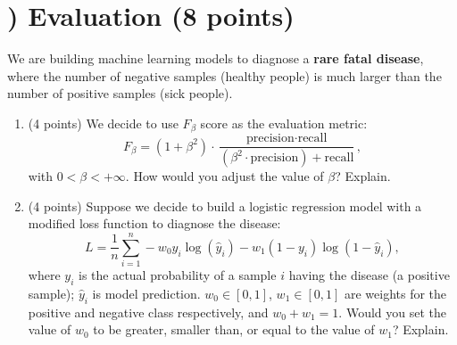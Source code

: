 \documentclass[11pt]{article}
\newcounter{QuestionCounter}
\newcounter{SubQuestionCounter}[QuestionCounter]
\newcommand{\newquestion}{\stepcounter{QuestionCounter}\setcounter{SubQuestionCounter}{1}\newpage}
\begin{document}
\section*{) Evaluation (8 points)}
We are building machine learning models to diagnose a \textbf{rare fatal disease}, where the number of negative samples (healthy people) is much larger than the number of positive samples (sick people).
\begin{enumerate}[(1)]
 \item (4 points) We decide to use $F_{\beta}$ score as the evaluation metric:
    \begin{equation}\label{q19}
        F_{\beta} = (1 + \beta^2) \cdot \frac{\text{precision}\cdot \text{recall}}{(\beta^2\cdot \text{precision}) + \text{recall}},
    \end{equation}
    with $0 < \beta < +\infty$. How would you adjust the value of $\beta$? Explain.\\
    \begin{answertext}{18cm}{}
     
    \end{answertext}
   
    \item (4 points) Suppose we decide to build a logistic regression model with a modified loss function to diagnose the disease:
    \begin{equation}\label{q20}
        L = \frac{1}{n}\sum_{i=1}^n-w_0y_i\log(\hat{y}_i) - w_1(1-y_i)\log(1-\hat{y}_i),
    \end{equation}
    where $y_i$ is the actual probability of a sample $i$ having the disease (a positive sample); $\hat{y}_i$ is model prediction. $w_0 \in [0,1]$, $w_1 \in [0,1]$ are weights for the positive and negative class respectively, and $w_0+w_1=1$. Would you set the value of $w_0$ to be greater, smaller than, or equal to the value of $w_1$? Explain.\\
    \begin{answertext}{18cm}{}
    
    \end{answertext}
\end{enumerate}

\newquestion
\end{document}
